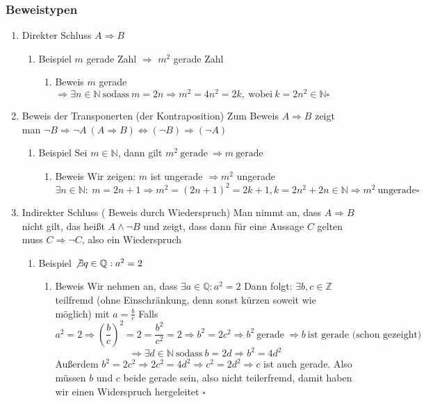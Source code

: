 \documentclass[11pt]{article}
\begin{document}
\subsubsection{Beweistypen}
\label{sec-2-1-3}
\begin{enumerate}
\item Direkter Schluss
\label{sec-2-1-3-1}
$A\Rightarrow B$
\begin{enumerate}
\item Beispiel
\label{sec-2-1-3-1-1}
$m$ gerade Zahl $\Rightarrow$ $m^2$ gerade Zahl
\begin{enumerate}
\item Beweis
\label{sec-2-1-3-1-1-1}
$m$ gerade $\Rightarrow \exists n\in\mathbb{N}~\text{sodass}~m = 2n \Rightarrow m^2 = 4n^2 = 2k,~\text{wobei}~k=2n^2\in\mathbb{N} \square$
\end{enumerate}
\end{enumerate}
\item Beweis der Transponerten (der Kontraposition)
\label{sec-2-1-3-2}
Zum Beweis $A\Rightarrow B$ zeigt man $\neg B\Rightarrow \neg A~(A\Rightarrow B)\Leftrightarrow (\neg B) \Rightarrow (\neg A)$
\begin{enumerate}
\item Beispiel
\label{sec-2-1-3-2-1}
Sei $m\in\mathbb{N}$, dann gilt $m^2~\text{gerade}~\Rightarrow m~\text{gerade}$
\begin{enumerate}
\item Beweis
\label{sec-2-1-3-2-1-1}
Wir zeigen: $m$ ist ungerade $\Rightarrow m^2$ ungerade
\[\exists n\in\mathbb{N}:~m=2n+1\Rightarrow m^2 = (2n+1)^2 = 2k+1, k=2n^2 + 2n\in\mathbb{N}\Rightarrow m^2~\text{ungerade} \square\]
\end{enumerate}
\end{enumerate}
\item Indirekter Schluss ( Beweis durch Wiederspruch)
\label{sec-2-1-3-3}
Man nimmt an, dass $A\Rightarrow B$ nicht gilt, das heißt $A \wedge \neg B$ und zeigt, dass dann für eine Aussage $C$ gelten muss $C\Rightarrow \neg C$, also ein Wiederspruch
\begin{enumerate}
\item Beispiel
\label{sec-2-1-3-3-1}
$\not\exists q\in\mathbb{Q}: a^2 = 2$
\begin{enumerate}
\item Beweis
\label{sec-2-1-3-3-1-1}
Wir nehmen an, dass $\exists a\in\mathbb{Q}: a^2=2$ Dann folgt:
$\exists b,c\in\mathbb{Z}$ teilfremd (ohne Einschränkung, denn sonst kürzen soweit wie möglich) mit $a=\frac{b}{c}$
Falls \[a^2=2\Rightarrow (\frac{b}{c})^2=2=\frac{b^2}{c^2}=2 \Rightarrow b^2 = 2c^2 \Rightarrow b^2~\text{gerade}~\Rightarrow b~\text{ist gerade (schon gezeight)}\] \[\Rightarrow\exists d\in\mathbb{N}~\text{sodass}~b=2d\Rightarrow b^2=4d^2\]
Außerdem $b^2=2c^2\Rightarrow 2c^2=4d^2\Rightarrow c^2=2d^2\Rightarrow c$ ist auch gerade. Also müssen $b$ und $c$ beide gerade sein, also nicht teilerfremd, damit haben wir einen Widerspruch hergeleitet $\square$
\end{enumerate}
\end{enumerate}
\end{enumerate}
\end{document}
